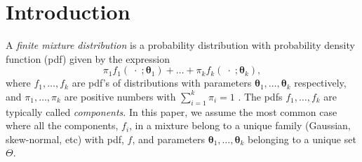 \documentclass[12pt, a4paper]{article}
\newcommand{\m}[1]{\boldsymbol{#1}}
\begin{document}



\section{Introduction}

\noindent  A \emph{finite mixture distribution} is a probability distribution with probability density function (pdf) given by the expression
\begin{equation}\label{mixt}
\pi_1 f_1(\;\cdot\; ; \m\theta_1) + \dots + \pi_k f_k(\;\cdot\; ; \m\theta_k),
\end{equation}
where $f_1, \dots, f_k$ are pdf's of distributions with parameters $\m\theta_1, \dots, \m\theta_k$ respectively, and $\pi_1, \dots, \pi_k$ are positive numbers with $\sum_{i=1}^k \pi_i = 1$ \citep{mclachlan2000finite}. The pdfs $f_1, \dots, f_k$ are typically called \emph{components}. In this paper, we assume the most common case where all the components, $f_i$, in a mixture belong to a unique family (Gaussian, skew-normal, etc) with pdf, $f$, and parameters $\m\theta_1, \dots, \m\theta_k$ belonging to a unique set $\Theta$. 
\end{document}
